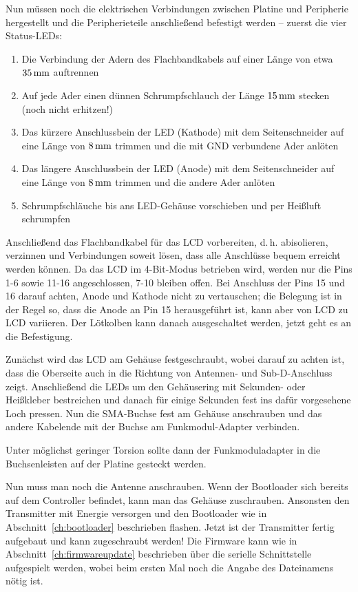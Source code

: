 \documentclass[pdftex, parskip, numbers=noenddot, toc=listof]{scrbook}
\begin{document}
	Nun müssen noch die elektrischen Verbindungen zwischen Platine und Peripherie hergestellt und die Peripherieteile anschließend befestigt werden -- zuerst die vier Status-LEDs:

	\begin{enumerate}\label{enum:leds}
		\item Die Verbindung der Adern des Flachbandkabels auf einer Länge von etwa $\unit[35]{mm}$ auftrennen
		\item Auf jede Ader einen dünnen Schrumpfschlauch der Länge $\unit[15]{mm}$ stecken (noch nicht erhitzen!)
		\item Das kürzere Anschlussbein der LED (Kathode) mit dem Seitenschneider auf eine Länge von $\unit[8]{mm}$ trimmen und die mit GND verbundene Ader anlöten
		\item Das längere Anschlussbein der LED (Anode) mit dem Seitenschneider auf eine Länge von $\unit[8]{mm}$ trimmen und die andere Ader anlöten
		\item Schrumpfschläuche bis ans LED-Gehäuse vorschieben und per Heißluft schrumpfen
	\end{enumerate}

	Anschließend das Flachbandkabel für das LCD vorbereiten, d.\,h. abisolieren, verzinnen und Verbindungen soweit lösen, dass alle Anschlüsse bequem erreicht werden können. Da das LCD im 4-Bit-Modus betrieben wird, werden nur die Pins 1-6 sowie 11-16 angeschlossen, 7-10 bleiben offen. Bei Anschluss der Pins 15 und 16 darauf achten, Anode und Kathode nicht zu vertauschen; die Belegung ist in der Regel so, dass die Anode an Pin 15 herausgeführt ist, kann aber von LCD zu LCD variieren. Der Lötkolben kann danach ausgeschaltet werden, jetzt geht es an die Befestigung.

	Zunächst wird das LCD am Gehäuse festgeschraubt, wobei darauf zu achten ist, dass die Oberseite auch in die Richtung von Antennen- und Sub-D-Anschluss zeigt. Anschließend die LEDs um den Gehäusering mit Sekunden- oder Heißkleber bestreichen und danach für einige Sekunden fest ins dafür vorgesehene Loch pressen. Nun die SMA-Buchse fest am Gehäuse anschrauben und das andere Kabelende mit der Buchse am Funkmodul-Adapter verbinden.

	Unter möglichst geringer Torsion sollte dann der Funkmoduladapter in die Buchsenleisten auf der Platine gesteckt werden.

	Nun muss man noch die Antenne anschrauben. Wenn der Bootloader sich bereits auf dem Controller befindet, kann man das Gehäuse zuschrauben. Ansonsten den Transmitter mit Energie versorgen und den Bootloader wie in Abschnitt~\ref{ch:bootloader} beschrieben flashen. Jetzt ist der Transmitter fertig aufgebaut und kann zugeschraubt werden! Die Firmware kann wie in Abschnitt~\ref{ch:firmwareupdate} beschrieben über die serielle Schnittstelle aufgespielt werden, wobei beim ersten Mal noch die Angabe des Dateinamens nötig ist.
\end{document}
